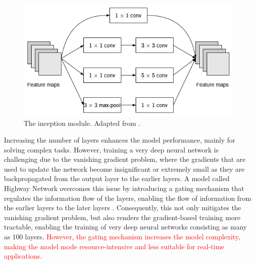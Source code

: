 \documentclass[preprint,12pt]{elsarticle}
\begin{document}
\begin{figure}[h!]
    \centering
    \includegraphics[scale=0.6]{fig_deep_sv_learning_cnn_inception.png}
    \caption{The inception module. Adapted from \citep{szegedy_going_2014}.}
    \label{fig_deep_sv_learning_cnn_inception}
\end{figure}

Increasing the number of layers enhances the model performance, mainly for solving complex tasks. However, training a very deep neural network is challenging due to the vanishing gradient problem, where the gradients that are used to update the network become insignificant or extremely small as they are backpropagated from the output layer to the earlier layers. A model called Highway Network overcomes this issue by introducing a gating mechanism that regulates the information flow of the layers, enabling the flow of information from the earlier layers to the later layers \citep{srivastava_highway_2015}. Consequently, this not only mitigates the vanishing gradient problem, but also renders the gradient-based training more tractable, enabling the training of very deep neural networks consisting as many as 100 layers. \textcolor{red}{However, the gating mechanism increases the model complexity, making the model mode resource-intensive and less suitable for real-time applications.}
\end{document}
